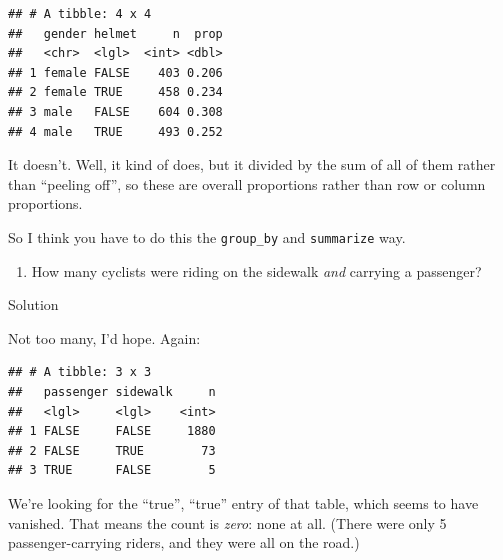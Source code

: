 \documentclass[]{tufte-book}
\newenvironment{Shaded}{}{}
\newcommand{\DataTypeTok}[1]{\textcolor[rgb]{0.56,0.13,0.00}{#1}}
\newcommand{\KeywordTok}[1]{\textcolor[rgb]{0.00,0.44,0.13}{\textbf{#1}}}
\newcommand{\NormalTok}[1]{#1}
\newcommand{\OperatorTok}[1]{\textcolor[rgb]{0.40,0.40,0.40}{#1}}
\newcommand{\StringTok}[1]{\textcolor[rgb]{0.25,0.44,0.63}{#1}}
\providecommand{\tightlist}{%
  \setlength{\itemsep}{0pt}\setlength{\parskip}{0pt}}
\theoremstyle{definition}
\theoremstyle{definition}
\theoremstyle{definition}
\theoremstyle{remark}
\begin{document}
\begin{Shaded}
\end{Shaded}

\begin{verbatim}
## # A tibble: 4 x 4
##   gender helmet     n  prop
##   <chr>  <lgl>  <int> <dbl>
## 1 female FALSE    403 0.206
## 2 female TRUE     458 0.234
## 3 male   FALSE    604 0.308
## 4 male   TRUE     493 0.252
\end{verbatim}

It doesn't. Well, it kind of does, but it divided by the sum of all of
them rather than ``peeling off'', so these are overall proportions
rather than row or column proportions.

So I think you have to do this the \texttt{group\_by} and
\texttt{summarize} way.

\begin{enumerate}
\def\labelenumi{(\alph{enumi})}
\setcounter{enumi}{9}
\tightlist
\item
  How many cyclists were riding on the sidewalk \emph{and} carrying a
  passenger?
\end{enumerate}

Solution

Not too many, I'd hope. Again:

\begin{Shaded}
\end{Shaded}

\begin{verbatim}
## # A tibble: 3 x 3
##   passenger sidewalk     n
##   <lgl>     <lgl>    <int>
## 1 FALSE     FALSE     1880
## 2 FALSE     TRUE        73
## 3 TRUE      FALSE        5
\end{verbatim}

We're looking for the ``true'', ``true'' entry of that table, which
seems to have vanished. That means the count is \emph{zero}: none at
all. (There were only 5 passenger-carrying riders, and they were all on
the road.)
\end{document}
